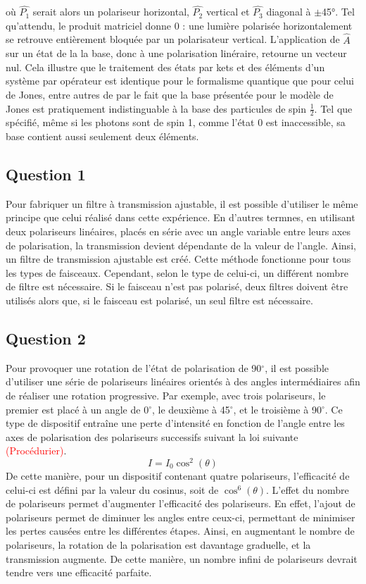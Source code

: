 \documentclass[11pt,letterpaper]{article}
\begin{document}
où $\hat{P_1}$ serait alors un polariseur horizontal, $\hat{P_2}$ vertical et $\hat{P_3}$ diagonal à $\pm$45°. Tel qu'attendu, le produit matriciel donne 0 : une
lumière polarisée horizontalement se retrouve entièrement bloquée par un polarisateur vertical. L'application de $\hat{A}$ sur un état de la la base, donc à une polarisation linéraire, retourne un vecteur nul. Cela illustre que le traitement
des états par kets et des éléments d'un système par opérateur est identique pour le formalisme quantique que pour celui de Jones, entre autres de par le fait que la base présentée pour le modèle de Jones est pratiquement indistinguable à la base des particules de spin $\frac{1}{2}$. Tel que spécifié, même si les photons sont de spin 1, comme l'état 0 est inaccessible, sa base contient aussi seulement deux éléments.

\subsection{Question 1}
Pour fabriquer un filtre à transmission ajustable, il est possible d'utiliser le même principe que celui réalisé dans cette expérience. En d'autres termnes, en utilisant deux polariseurs linéaires, placés en série avec un angle variable entre leurs axes de polarisation, la transmission devient dépendante de la valeur de l'angle. Ainsi, un filtre de transmission ajustable est créé. Cette méthode fonctionne pour tous les types de faisceaux. Cependant, selon le type de celui-ci, un différent nombre de filtre est nécessaire. Si le faisceau n'est pas polarisé, deux filtres doivent être utilisés alors que, si le faisceau est polarisé, un seul filtre est nécessaire.

\subsection{Question 2}
Pour provoquer une rotation de l'état de polarisation de 90$^\circ$, il est possible d'utiliser une série de polariseurs linéaires orientés à des angles intermédiaires afin de réaliser une rotation progressive. Par exemple, avec trois polariseurs, le premier est placé à un angle de 0$^\circ$, le deuxième à 45$^\circ$, et le troisième à 90$^\circ$. Ce type de dispositif entraîne une perte d'intensité en fonction de l'angle entre les axes de polarisation des polariseurs successifs suivant la loi suivante \textcolor{red}{(Procédurier)}.
\begin{equation}
  I=I_{0}\cos^{2}(\theta)
\end{equation}
De cette manière, pour un dispositif contenant quatre polariseurs, l'efficacité de celui-ci est défini par la valeur du cosinus, soit de $\cos^{6}(\theta)$. L'effet du nombre de polariseurs permet d'augmenter l'efficacité des polariseurs. En effet, l'ajout de polariseurs permet de diminuer les angles entre ceux-ci, permettant de minimiser les pertes causées entre les différentes étapes. Ainsi, en augmentant le nombre de polariseurs, la rotation de la polarisation est davantage graduelle, et la transmission augmente. De cette manière, un nombre infini de polariseurs devrait tendre vers une efficacité parfaite.
\end{document}
